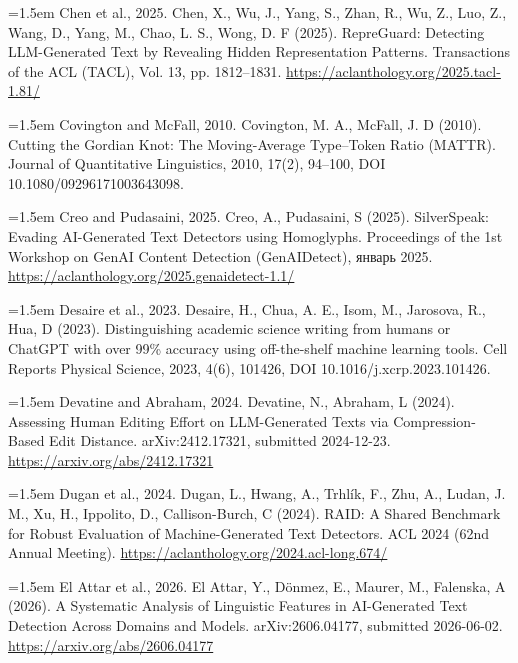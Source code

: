 \documentclass[11pt,a4paper]{article}
\renewcommand{\_}{\textunderscore\allowbreak}
\begin{document}
\noindent\hangindent=1.5em Chen et al., 2025. Chen, X., Wu, J., Yang, S., Zhan, R., Wu, Z., Luo, Z., Wang, D., Yang, M., Chao, L. S., Wong, D. F (2025). RepreGuard: Detecting LLM-Generated Text by Revealing Hidden Representation Patterns. Transactions of the ACL (TACL), Vol. 13, pp. 1812–1831. \url{https://aclanthology.org/2025.tacl-1.81/}\par\smallskip

\noindent\hangindent=1.5em Covington and McFall, 2010. Covington, M. A., McFall, J. D (2010). Cutting the Gordian Knot: The Moving-Average Type–Token Ratio (MATTR). Journal of Quantitative Linguistics, 2010, 17(2), 94–100, DOI 10.1080/09296171003643098.\par\smallskip

\noindent\hangindent=1.5em Creo and Pudasaini, 2025. Creo, A., Pudasaini, S (2025). SilverSpeak: Evading AI-Generated Text Detectors using Homoglyphs. Proceedings of the 1st Workshop on GenAI Content Detection (GenAIDetect), \foreignlanguage{russian}{январь} 2025. \url{https://aclanthology.org/2025.genaidetect-1.1/}\par\smallskip

\noindent\hangindent=1.5em Desaire et al., 2023. Desaire, H., Chua, A. E., Isom, M., Jarosova, R., Hua, D (2023). Distinguishing academic science writing from humans or ChatGPT with over 99\% accuracy using off-the-shelf machine learning tools. Cell Reports Physical Science, 2023, 4(6), 101426, DOI 10.1016/j.xcrp.2023.101426.\par\smallskip

\noindent\hangindent=1.5em Devatine and Abraham, 2024. Devatine, N., Abraham, L (2024). Assessing Human Editing Effort on LLM-Generated Texts via Compression-Based Edit Distance. arXiv:2412.17321, submitted 2024-12-23. \url{https://arxiv.org/abs/2412.17321}\par\smallskip

\noindent\hangindent=1.5em Dugan et al., 2024. Dugan, L., Hwang, A., Trhl\'ik, F., Zhu, A., Ludan, J. M., Xu, H., Ippolito, D., Callison-Burch, C (2024). RAID: A Shared Benchmark for Robust Evaluation of Machine-Generated Text Detectors. ACL 2024 (62nd Annual Meeting). \url{https://aclanthology.org/2024.acl-long.674/}\par\smallskip

\noindent\hangindent=1.5em El Attar et al., 2026. El Attar, Y., D\"onmez, E., Maurer, M., Falenska, A (2026). A Systematic Analysis of Linguistic Features in AI-Generated Text Detection Across Domains and Models. arXiv:2606.04177, submitted 2026-06-02. \url{https://arxiv.org/abs/2606.04177}\par\smallskip
\end{document}
